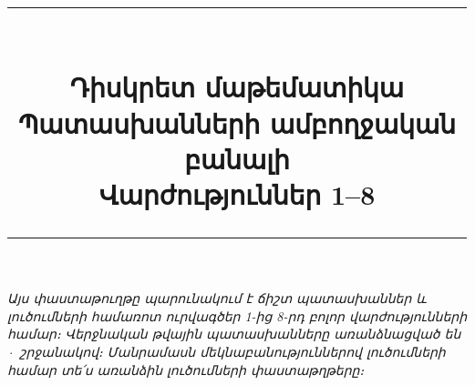 \documentclass[12pt, a4paper]{article}
\title{%
  \vspace{-1.5cm}
  {\color{secBlue}\rule{\textwidth}{2pt}}\\[12pt]
  \textbf{\color{secBlue}Դիսկրետ մաթեմատիկա}\\[4pt]
  \Large Պատասխանների ամբողջական բանալի\\[4pt]
  \large Վարժություններ 1--8\\[6pt]
  {\color{secBlue}\rule{\textwidth}{2pt}}
}
\author{}
\date{}
\begin{document}
\maketitle
\thispagestyle{fancy}

\vspace{-0.5cm}
\begin{tcolorbox}[
  colback=answerBg, colframe=answerFrame,
  boxrule=0.8pt, arc=3pt,
  left=8pt, right=8pt, top=6pt, bottom=6pt
]
\textit{Այս փաստաթուղթը պարունակում է ճիշտ պատասխաններ և լուծումների համառոտ ուրվագծեր 1-ից 8-րդ բոլոր վարժությունների համար։ Վերջնական թվային պատասխանները առանձնացված են $\boxed{\cdot}$ շրջանակով։ Մանրամասն մեկնաբանություններով լուծումների համար տե՛ս առանձին լուծումների փաստաթղթերը։}
\end{tcolorbox}

\bigskip
\tableofcontents

\newpage


\newpage


\newpage


\newpage


\newpage


\newpage


\newpage

\end{document}
